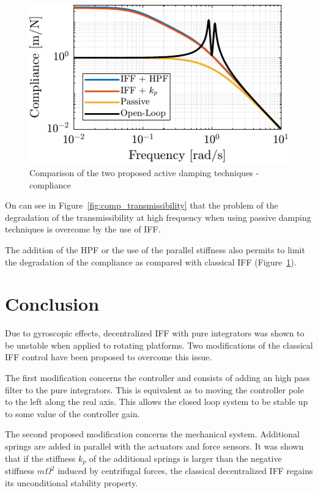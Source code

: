 \documentclass[10pt]{iopart}
\begin{document}
\begin{figure}[htbp]
\centering
\includegraphics[scale=1,scale=1]{figs/fig19.pdf}
\caption{\label{fig:comp_compliance}Comparison of the two proposed active damping techniques - compliance}
\end{figure}

On can see in Figure~\ref{fig:comp_transmissibility} that the problem of the degradation of the transmissibility at high frequency when using passive damping techniques is overcome by the use of IFF.

The addition of the HPF or the use of the parallel stiffness also permits to limit the degradation of the compliance as compared with classical IFF (Figure~\ref{fig:comp_compliance}).

\section{Conclusion}
\label{sec:org2f060ad}
\label{sec:conclusion}

Due to gyroscopic effects, decentralized IFF with pure integrators was shown to be unstable when applied to rotating platforms.
Two modifications of the classical IFF control have been proposed to overcome this issue.

The first modification concerns the controller and consists of adding an high pass filter to the pure integrators.
This is equivalent as to moving the controller pole to the left along the real axis.
This allows the closed loop system to be stable up to some value of the controller gain.

The second proposed modification concerns the mechanical system.
Additional springs are added in parallel with the actuators and force sensors.
It was shown that if the stiffness \(k_p\) of the additional springs is larger than the negative stiffness \(m \Omega^2\) induced by centrifugal forces, the classical decentralized IFF regains its unconditional stability property.
\end{document}
